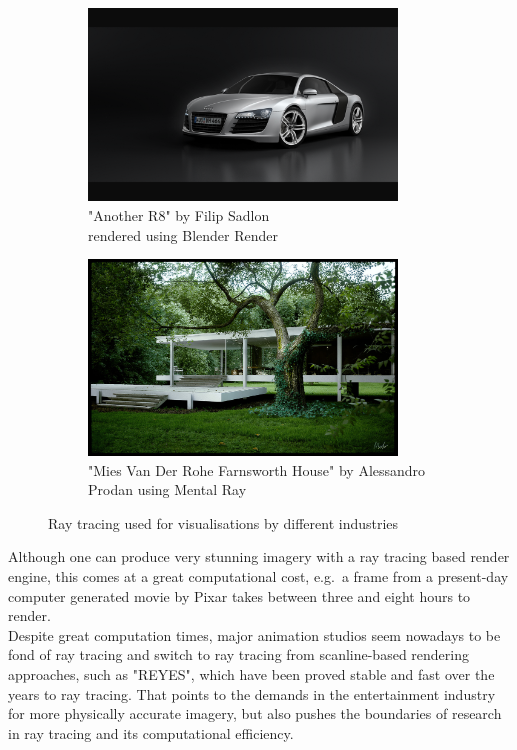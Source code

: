 \documentclass{article}
\begin{document}
\begin{figure}[h]
	\centering
	
	\begin{subfigure}{0.5\textwidth}
		\includegraphics[width=0.9\textwidth]{audi}
		\caption{"Another R8" by Filip Sadlon \\ rendered using Blender Render}
		\label{fig:audi}
	\end{subfigure}%
	\hfill
	\begin{subfigure}{0.5\textwidth}
		\includegraphics[width=0.9\textwidth]{archi_render}
		\caption{"Mies Van Der Rohe Farnsworth House" by Alessandro Prodan using Mental Ray}
		\label{fig:arch}
	\end{subfigure}
	
	\caption{Ray tracing used for visualisations by different industries}
\end{figure}

Although one can produce very stunning imagery with a ray tracing based render engine, this  comes at a great computational cost, e.g.\ a frame from a present-day computer generated movie by Pixar takes between three and eight hours to render. \cite{pixarRentime} \\
Despite great computation times, major animation studios seem nowadays to be fond of ray tracing and switch to ray tracing from scanline-based rendering approaches, such as "REYES", which have been proved stable and fast over the years to ray tracing. \cite{pixarSwitch} That points to the demands in the entertainment industry for more physically accurate imagery, but also pushes the boundaries of research in ray tracing and its computational efficiency. \cite{disneyHyperion}
\end{document}
